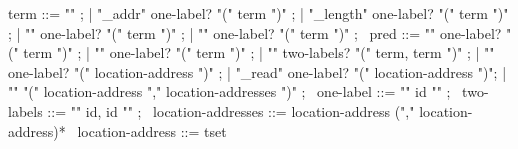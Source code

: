 \begin{syntax}
  term ::= "\null" ;
        | "\base_addr" one-label? "(" term ")" ;
        | "\block_length" one-label? "(" term ")" ;
        | "\offset" one-label?  "(" term ")" ;
        | { "\allocation" } one-label?   "(" term ")" ;
       \
  pred ::=  "\allocable" one-label? "(" term ")" ;
       |  "\freeable" one-label? "(" term ")" ;
       | "\fresh"   two-labels? "(" term, term ")" ;
       | "\valid"  one-label?  "(" location-address ")" ;
       | "\valid_read"  one-label? "(" location-address ")";
       | "\separated" "(" location-address "," location-addresses ")" ;
       \
  one-label ::= "{" id "}" ;
       \
  two-labels ::= "{" id, id "}" ;
       \
  location-addresses ::= location-address ("," location-address)*
  \
  location-address ::= tset
\end{syntax}

